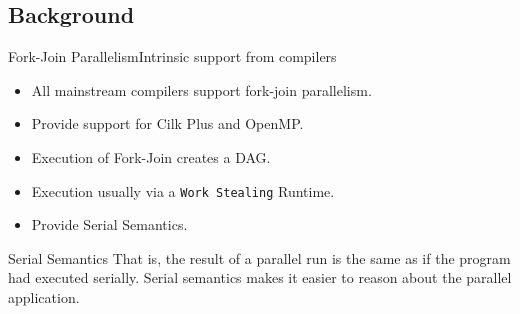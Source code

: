 \documentclass{beamer}
\begin{document}
\subsection{Background}

\begin{frame}{Fork-Join Parallelism}{Intrinsic support from compilers}
  \begin{itemize}
  \item All mainstream compilers support fork-join parallelism.
  \item Provide support for Cilk Plus and OpenMP.
  \item Execution of Fork-Join creates a DAG.
  \item Execution usually via a \texttt{Work Stealing} Runtime.
\item Provide Serial Semantics.
  \end{itemize}
 \begin{block}{Serial Semantics}
That is, the result of a parallel run is the same as if the program had executed serially. Serial semantics makes it easier to reason about the parallel application.
\end{block} 
\end{frame}
\end{document}
